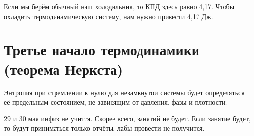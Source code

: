 \documentclass{book}
\begin{document}
\begin{itemize}
    Если мы берём обычный наш холодильник, то КПД здесь равно 4,17. Чтобы охладить термодинамическую систему, нам нужно привести 4,17 Дж.
\end{itemize}

\section{Третье начало термодинамики (теорема Неркста)}
Энтропия при стремлении к нулю для незамкнутой системы будет определяться её предельным состоянием, не зависящим от давления, фазы и плотности.



29 и 30 мая инфиз не учится. Скорее всего, занятий не будет. Если занятие будет, то будут приниматься только отчёты, лабы провести не получится.
\end{document}
